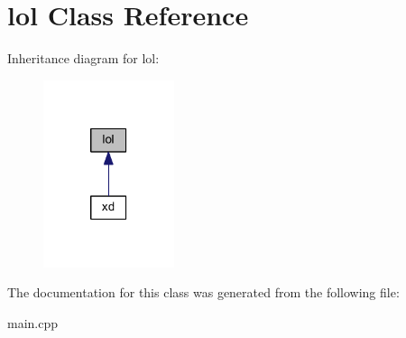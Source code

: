 \hypertarget{classlol}{}\section{lol Class Reference}
\label{classlol}


Inheritance diagram for lol\+:\nopagebreak
\begin{figure}[H]
\begin{center}
\leavevmode
\includegraphics[width=109pt]{classlol__inherit__graph}
\end{center}
\end{figure}


The documentation for this class was generated from the following file\+:\begin{DoxyCompactItemize}
\item 
main.\+cpp\end{DoxyCompactItemize}
